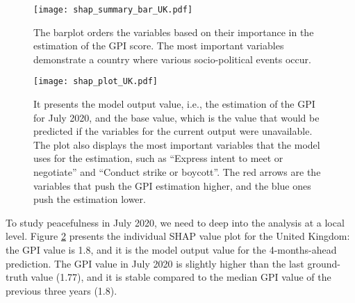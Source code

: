 \documentclass{bmcart}
\begin{document}
\begin{figure}[h!]
\centering
\texttt{[image: shap\_summary\_bar\_UK.pdf]}
  \caption{
      The barplot orders the variables based on their importance in the estimation of the GPI score. The most important variables demonstrate a country where various socio-political events occur.}
\label{fig:barplot_UK}
\end{figure}

\begin{figure}[h!]
\centering
\texttt{[image: shap\_plot\_UK.pdf]}
  \caption{
      It presents the model output value, i.e., the estimation of the GPI for July 2020, and the base value, which is the value that would be predicted if the variables for the current output were unavailable. The plot also displays the most important variables that the model uses for the estimation, such as ``Express intent to meet or negotiate'' and ``Conduct strike or boycott''. The red arrows are the variables that push the GPI estimation higher, and the blue ones push the estimation lower.}
\label{fig:individual_plot_UK}
\end{figure}

To study peacefulness in July 2020, we need to deep into the analysis at a local level. 
Figure \ref{fig:individual_plot_UK} presents the individual SHAP value plot for the United Kingdom: the GPI value is 1.8, and it is the model output value for the 4-months-ahead prediction. 
The GPI value in July 2020 is slightly higher than the last ground-truth value (1.77), and it is stable compared to the median GPI value of the previous three years (1.8). 
\end{document}
